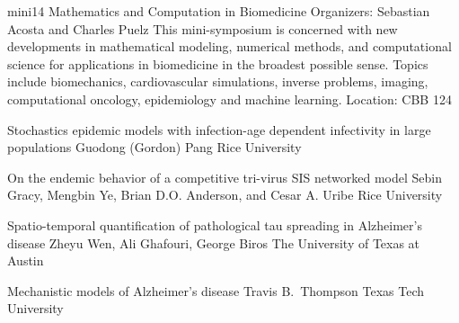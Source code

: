 \mini
{mini14}
{Mathematics and Computation in Biomedicine}
{Organizers: Sebastian Acosta and Charles Puelz}
{This mini-symposium is concerned with new developments in mathematical modeling, numerical methods, and computational science for applications in biomedicine in the broadest possible sense. Topics include biomechanics, cardiovascular simulations, inverse problems, imaging, computational oncology, epidemiology and machine learning.}
{Location: CBB 124}

\begin{talks}
\item\talk
{Stochastics epidemic models with infection-age dependent infectivity in large populations}
{Guodong (Gordon) Pang}
{Rice University}
\item\talk
{On the endemic behavior of a competitive tri-virus SIS networked model}
{Sebin Gracy, Mengbin Ye, Brian D.O. Anderson, and Cesar A. Uribe}
{Rice University}
\item\talk
{Spatio-temporal quantification of pathological tau spreading in Alzheimer's disease}
{Zheyu Wen, Ali Ghafouri, George Biros}
{The University of Texas at Austin}
\item\talk
{Mechanistic models of Alzheimer's disease}
{Travis B.~Thompson}
{Texas Tech University}
\end{talks}
\room

